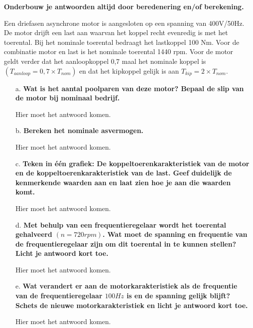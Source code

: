 \textbf{Onderbouw je antwoorden altijd door beredenering en/of berekening.}

Een driefasen asynchrone motor is aangesloten op een spanning van 400V/50Hz.
De motor drijft een last aan waarvan het koppel recht evenredig is met het toerental.
Bij het nominale toerental bedraagt het lastkoppel 100 Nm.
Voor de combinatie motor en last is het nominale toerental 1440 rpm.
Voor de motor geldt verder dat het aanloopkoppel 0,7 maal het nominale koppel is
$(T_{aanloop} = 0,7 \times T_{nom})$ en dat het kipkoppel gelijk is aan $T_{kip} = 2 \times T_{nom}$.

\begin{enumerate}
    \item [a.] \textbf{Wat is het aantal poolparen van deze motor? Bepaal de slip van de motor bij nominaal bedrijf.}
    
        Hier moet het antwoord komen.

    \item [b.] \textbf{Bereken het nominale asvermogen.}

        Hier moet het antwoord komen.

    \item [c.] \textbf{Teken in één grafiek: De koppeltoerenkarakteristiek van de motor en de koppeltoerenkarakteristiek van de last. Geef duidelijk de kenmerkende waarden aan en laat zien hoe je aan die waarden komt.}

        Hier moet het antwoord komen.

    \item [d.] \textbf{Met behulp van een frequentieregelaar wordt het toerental gehalveerd $(n = 720 rpm)$. Wat moet de spanning en frequentie van de frequentieregelaar zijn om dit toerental in te kunnen stellen? Licht je antwoord kort toe.} 

        Hier moet het antwoord komen.

    \item [e.] \textbf{Wat verandert er aan de motorkarakteristiek als de frequentie van de frequentieregelaar $100 Hz$ is en de spanning gelijk blijft?
    Schets de nieuwe motorkarakteristiek en licht je antwoord kort toe.}

        Hier moet het antwoord komen.

\end{enumerate}